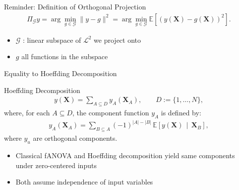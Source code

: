
\begin{frame}{Reminder: Definition of Orthogonal Projection} %
  \begin{align*}
    \Pi_{\mathcal{G}}y = \arg\min_{g \in \mathcal{G}} \|y - g\|^2
= \arg\min_{g \in \mathcal{G}} \mathbb{E}[(y(\boldsymbol{X}) - g(\boldsymbol{X}))^2].
\end{align*}
  \begin{itemize}
    \item $\mathcal{G}$ : linear subspace of $\mathcal{L}^2$ we project onto
    \item $g$ all functions in the subspace
  \end{itemize}
\end{frame}



\begin{frame}{Equality to Hoeffding Decomposition} %
  \begin{block}{Hoeffding Decomposition}
    \begin{align}
    y(\boldsymbol{X})
=
\sum_{A \subseteq D} 
y_A(\boldsymbol{X}_A),
\qquad
D := \{1,\dots,N\},
\end{align}
where, for each $A \subseteq D$, the component function $y_A$ is defined by:
\begin{align}\label{eq:hoeffding_components}
    y_A(\boldsymbol{X}_A)
=
\sum_{B \subseteq A}
(-1)^{|A|-|B|}
\,\mathbb{E}\!\left[
  y(\boldsymbol{X}) 
  \,\middle|\, 
  \boldsymbol{X}_B
\right],
\end{align}
  where $y_u$ are orthogonal components.
  \end{block}
  \begin{itemize}
    \item Classical fANOVA and Hoeffding decomposition yield same components under zero-centered inputs
    \item Both assume independence of input variables
  \end{itemize}
  
\end{frame}

